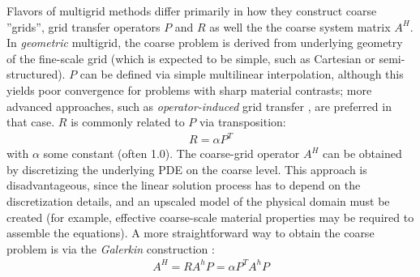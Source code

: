 Flavors of multigrid methods differ primarily in how they construct coarse ''grids'', grid transfer operators $P$ and $R$ as well the the coarse system matrix $A^H$.   In \textit{geometric} multigrid, the coarse problem is derived from underlying geometry of the fine-scale grid (which is expected to be simple, such as Cartesian or semi-structured).   $P$ can be defined via simple multilinear interpolation, although this yields poor convergence for problems with sharp material contrasts; more advanced approaches, such as \textit{operator-induced} grid transfer \cite{Alcouffe1981}, are preferred in that case.   $R$ is commonly related to $P$ via transposition:
\begin{align}
    R = \alpha P^T
\end{align}
with $\alpha$ some constant (often 1.0).   The coarse-grid operator $A^H$ can be obtained by discretizing the underlying PDE on the coarse level.   This approach is disadvantageous, since the linear solution process has to depend on the discretization details, and an upscaled model of the physical domain must be created (for example, effective coarse-scale material properties may be required to assemble the equations).   A more straightforward way to obtain the coarse problem is via the \textit{Galerkin} construction \cite{Nicolaides1975}:
\begin{align}
    A^H = R A^h P = \alpha P^T A^h P
\end{align}
